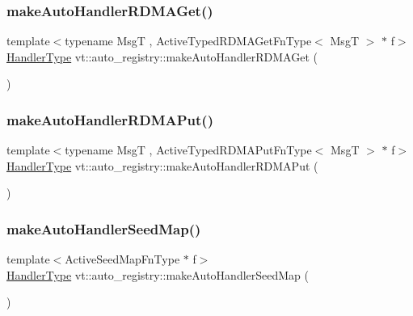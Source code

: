 \subsubsection{\texorpdfstring{make\+Auto\+Handler\+R\+D\+M\+A\+Get()}{makeAutoHandlerRDMAGet()}}
{\footnotesize\ttfamily template$<$typename MsgT , Active\+Typed\+R\+D\+M\+A\+Get\+Fn\+Type$<$ Msg\+T $>$ $\ast$ f$>$ \\
\hyperlink{namespacevt_af64846b57dfcaf104da3ef6967917573}{Handler\+Type} vt\+::auto\+\_\+registry\+::make\+Auto\+Handler\+R\+D\+M\+A\+Get (\begin{DoxyParamCaption}{ }\end{DoxyParamCaption})\hspace{0.3cm}{\ttfamily [inline]}}

\mbox{\label{namespacevt_1_1auto__registry_ab932bdb453695e6be54e2647dabd8c2a}} 
\subsubsection{\texorpdfstring{make\+Auto\+Handler\+R\+D\+M\+A\+Put()}{makeAutoHandlerRDMAPut()}}
{\footnotesize\ttfamily template$<$typename MsgT , Active\+Typed\+R\+D\+M\+A\+Put\+Fn\+Type$<$ Msg\+T $>$ $\ast$ f$>$ \\
\hyperlink{namespacevt_af64846b57dfcaf104da3ef6967917573}{Handler\+Type} vt\+::auto\+\_\+registry\+::make\+Auto\+Handler\+R\+D\+M\+A\+Put (\begin{DoxyParamCaption}{ }\end{DoxyParamCaption})\hspace{0.3cm}{\ttfamily [inline]}}

\mbox{\label{namespacevt_1_1auto__registry_a566748acf9e0867edadcf5e556b01b00}} 
\subsubsection{\texorpdfstring{make\+Auto\+Handler\+Seed\+Map()}{makeAutoHandlerSeedMap()}}
{\footnotesize\ttfamily template$<$Active\+Seed\+Map\+Fn\+Type $\ast$ f$>$ \\
\hyperlink{namespacevt_af64846b57dfcaf104da3ef6967917573}{Handler\+Type} vt\+::auto\+\_\+registry\+::make\+Auto\+Handler\+Seed\+Map (\begin{DoxyParamCaption}{ }\end{DoxyParamCaption})\hspace{0.3cm}{\ttfamily [inline]}}

